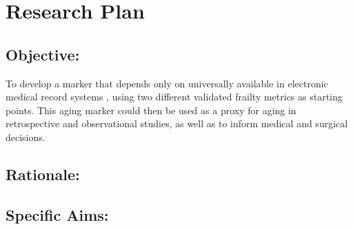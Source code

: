 \section{Research Plan }\label{research-plan}


\subsection{Objective:}\label{objective}
  
To develop a marker\cite{Orkaby_2017} that depends only on universally available in electronic medical record systems ,
using two different validated frailty metrics as starting points. This
aging marker could then be used as a proxy for aging in retrospective
and observational studies, as well as to inform medical and surgical
decisions.


\subsection{Rationale:}\label{rationale}

\subsection{Specific Aims:}\label{specific-aims}
